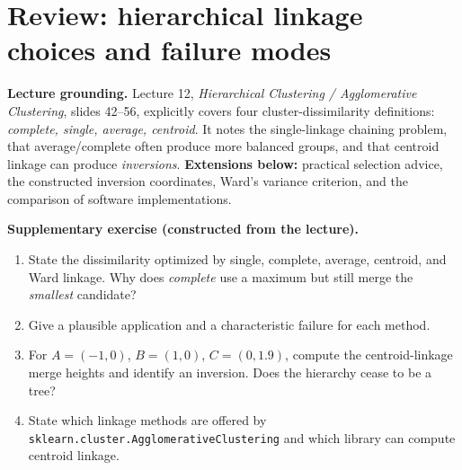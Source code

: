 \section{Review: hierarchical linkage choices and failure modes}
\label{sec:review-linkage}
\begin{concept}
\textbf{Lecture grounding.} Lecture 12, \emph{Hierarchical Clustering / Agglomerative Clustering}, slides 42--56, explicitly covers four cluster-dissimilarity definitions: \emph{complete, single, average, centroid}. It notes the single-linkage chaining problem, that average/complete often produce more balanced groups, and that centroid linkage can produce \emph{inversions}. \textbf{Extensions below:} practical selection advice, the constructed inversion coordinates, Ward's variance criterion, and the comparison of software implementations.
\end{concept}
\begin{reviewproblem}
\textbf{Supplementary exercise (constructed from the lecture).}
\begin{enumerate}[label=\textbf{(\alph*)}]
\item State the dissimilarity optimized by single, complete, average, centroid, and Ward linkage. Why does \emph{complete} use a maximum but still merge the \emph{smallest} candidate?
\item Give a plausible application and a characteristic failure for each method.
\item For $A=(-1,0)$, $B=(1,0)$, $C=(0,1.9)$, compute the centroid-linkage merge heights and identify an inversion. Does the hierarchy cease to be a tree?
\item State which linkage methods are offered by \texttt{sklearn.cluster.AgglomerativeClustering} and which library can compute centroid linkage.
\end{enumerate}
\end{reviewproblem}

